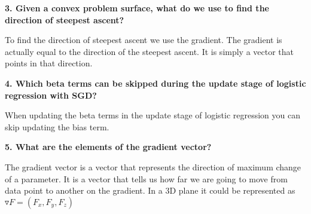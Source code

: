 \documentclass[11pt, oneside]{article}   	%
\begin{document}
\textbf{3. Given a convex problem surface, what do we use to find the direction of steepest ascent?}

To find the direction of steepest ascent we use the gradient. The gradient is actually equal to the direction of the steepest ascent. It is simply a vector that points in that direction. 

\textbf{4. Which beta terms can be skipped during the update stage of logistic regression with SGD?}

When updating the beta terms in the update stage of logistic regression you can skip updating the bias term. 

\textbf{5. What are the elements of the gradient vector?}

The gradient vector is a vector that represents the direction of maximum change of a parameter. It is a vector that tells us how far we are going to move from data point to another on the gradient. In a 3D plane it could be represented as $\triangledown F = (F_x, F_y, F_z)$
\end{document}
